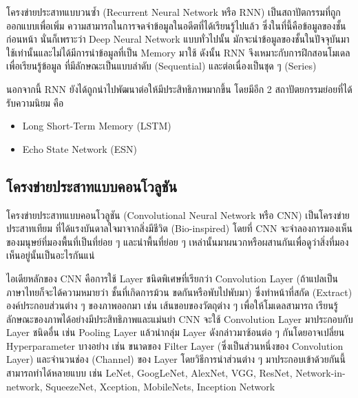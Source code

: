 โครงข่ายประสาทแบบวนซ้ำ (Recurrent Neural Network หรือ RNN)\autocite{abiodun2018} เป็นสถาปัตกรรมที่ถูกออกแบบเพื่อเพิ่ม%
ความสามารถในการจดจำข้อมูลในอดีตที่ได้เรียนรู้ไปแล้ว ซึ่งในที่นี้คือข้อมูลของชั้นก่อนหน้า นั่นก็เพราะว่า Deep Neural Network แบบทั่วไปนั้น%
มักจะนำข้อมูลของชั้นในปัจจุบันมาใช้เท่านั้นและไม่ได้มีการนำข้อมูลที่เป็น Memory มาใช้ ดังนั้น RNN จึงเหมาะกับการฝึกสอนโมเดลเพื่อเรียนรู้ข้อมูล%
ที่มีลักษณะเป็นแบบลำดับ (Sequential) และต่อเนื่องเป็นชุด ๆ (Series)

นอกจากนี้ RNN ยังได้ถูกนำไปพัฒนาต่อให้มีประสิทธิภาพมากขึ้น โดยมีอีก 2 สถาปัตยกรรมย่อยที่ได้รับความนิยม คือ

\begin{itemize}[topsep=0pt,noitemsep]
    \item Long Short-Term Memory (LSTM)\autocite{hochreiter1997a}
    \item Echo State Network (ESN)\autocite{jaeger2004}
\end{itemize}

\subsection{โครงข่ายประสาทแบบคอนโวลูชัน}
\label{ssec:cnn}

โครงข่ายประสาทแบบคอนโวลูชัน (Convolutional Neural Network หรือ CNN)\autocite{alzubaidi2021} เป็นโครงข่ายประสาทเทียม%
ที่ได้แรงบันดาลใจมาจากสิ่งมีชีวิต (Bio-inspired) โดยที่ CNN จะจำลองการมองเห็นของมนุษย์ที่มองพื้นที่เป็นที่ย่อย ๆ และนำพื้นที่ย่อย ๆ 
เหล่านั้นมาผนวกหรือผสานกันเพื่อดูว่าสิ่งที่มองเห็นอยู่นั้นเป็นอะไรกันแน่

ไอเดียหลักของ CNN คือการใช้ Layer ชนิดพิเศษที่เรียกว่า Convolution Layer (ถ้าแปลเป็นภาษาไทยก็จะได้ความหมายว่า ชั้นที่เกิดการม้วน%
ขดกันหรือพับไปพับมา) ซึ่งทำหน้าที่สกัด (Extract) องค์ประกอบส่วนต่าง ๆ ของภาพออกมา เช่น เส้นขอบของวัตถุต่าง ๆ เพื่อให้โมเดลสามารถ%
เรียนรู้ลักษณะของภาพได้อย่างมีประสิทธิภาพและแม่นยำ CNN จะใช้ Convolution Layer มาประกอบกับ Layer ชนิดอื่น เช่น Pooling Layer 
แล้วนำกลุ่ม Layer ดังกล่าวมาซ้อนต่อ ๆ กันโดยอาจเปลี่ยน Hyperparameter บางอย่าง เช่น ขนาดของ Filter Layer (ซึ่งเป็นส่วนหนึ่งของ 
Convolution Layer) และจำนวนช่อง (Channel) ของ Layer โดยวิธีการนำส่วนต่าง ๆ มาประกอบเข้าด้วยกันนี้สามารถทำได้หลายแบบ เช่น 
LeNet, GoogLeNet, AlexNet, VGG, ResNet, Network-in-network, SqueezeNet, Xception, MobileNets, Inception Network

